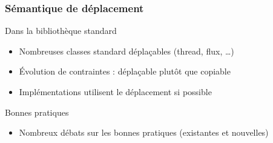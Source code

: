 \documentclass[C++.tex]{subfiles}
\begin{document}
\begin{frame}
	\frametitle{Sémantique de déplacement}
	\begin{block}{Dans la bibliothèque standard}
		\begin{itemize}
			\item Nombreuses classes standard déplaçables (thread, flux, \ldots)


			\item Évolution de contraintes : déplaçable plutôt que copiable

			
			\item Implémentations utilisent le déplacement si possible
		\end{itemize}
	\end{block}

	\begin{block}{Bonnes pratiques}
		\begin{itemize}
			\item Nombreux débats sur les bonnes pratiques (existantes et nouvelles)
		\end{itemize}

	\end{block}
\end{frame}
\end{document}
